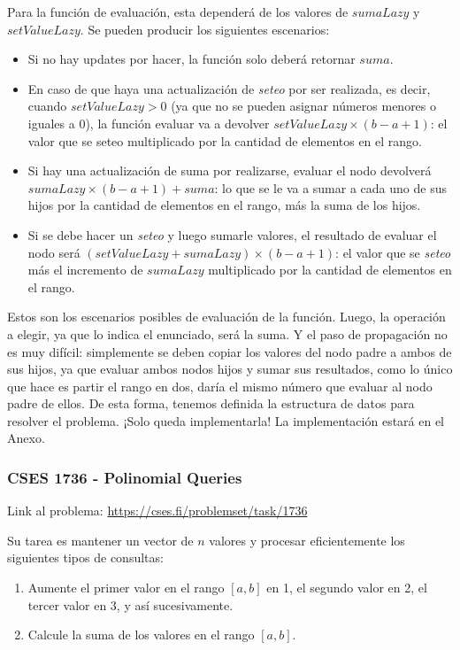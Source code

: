 \documentclass{article}
\begin{document}
Para la función de evaluación, esta dependerá de los valores de $sumaLazy$ y $setValueLazy$. Se pueden producir los siguientes escenarios:

\begin{itemize}
    \item Si no hay updates por hacer, la función solo deberá retornar $suma$.
    \item En caso de que haya una actualización de \textit{seteo} por ser realizada, es decir, cuando $setValueLazy > 0$ (ya que no se pueden asignar números menores o iguales a $0$), la función evaluar va a devolver $setValueLazy \times (b-a+1)$: el valor que se seteo multiplicado por la cantidad de elementos en el rango.
    \item Si hay una actualización de suma por realizarse, evaluar el nodo devolverá $sumaLazy \times (b-a+1) + suma$: lo que se le va a sumar a cada uno de sus hijos por la cantidad de elementos en el rango, más la suma de los hijos.
    \item Si se debe hacer un \textit{seteo} y luego sumarle valores, el resultado de evaluar el nodo será $(setValueLazy  + sumaLazy) \times (b-a+1)$: el valor que se \textit{seteo} más el incremento de $sumaLazy$ multiplicado por la cantidad de elementos en el rango.
\end{itemize}

Estos son los escenarios posibles de evaluación de la función. Luego, la operación a elegir, ya que lo indica el enunciado, será la suma. Y el paso de propagación no es muy difícil: simplemente se deben copiar los valores del nodo padre a ambos de sus hijos, ya que evaluar ambos nodos hijos y sumar sus resultados, como lo único que hace es partir el rango en dos, daría el mismo número que evaluar al nodo padre de ellos. De esta forma, tenemos definida la estructura de datos para resolver el problema. ¡Solo queda implementarla! La implementación estará en el Anexo.

\subsubsection{CSES 1736 - Polinomial Queries}

Link al problema: \href{https://cses.fi/problemset/task/1736}{https://cses.fi/problemset/task/1736}
\begin{tcolorbox}Su tarea es mantener un vector de $n$ valores y procesar eficientemente los siguientes tipos de consultas:
\begin{enumerate}
    \item Aumente el primer valor en el rango $[a,b]$ en 1, el segundo valor en 2, el tercer valor en 3, y así sucesivamente.
    \item Calcule la suma de los valores en el rango $[a,b]$.
\end{enumerate}
\end{tcolorbox}
\end{document}
